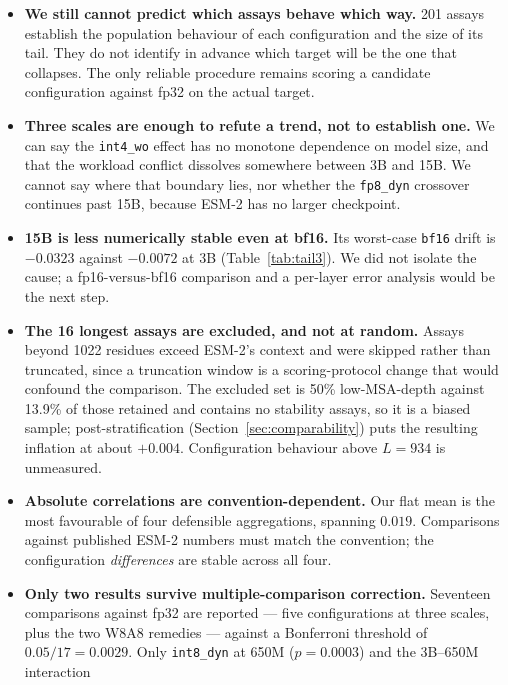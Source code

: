 \documentclass[11pt]{article}
\newcommand{\cfg}[1]{\texttt{#1}}
\begin{document}
\begin{itemize}
  \item \textbf{We still cannot predict which assays behave which way.} 201
        assays establish the population behaviour of each configuration and the
        size of its tail. They do not identify in advance which target will be
        the one that collapses. The only reliable procedure remains scoring a
        candidate configuration against fp32 on the actual target.
  \item \textbf{Three scales are enough to refute a trend, not to establish
        one.} We can say the \cfg{int4\_wo} effect has no monotone dependence on
        model size, and that the workload conflict dissolves somewhere between
        3B and 15B. We cannot say where that boundary lies, nor whether the
        \cfg{fp8\_dyn} crossover continues past 15B, because ESM-2 has no larger
        checkpoint.
  \item \textbf{15B is less numerically stable even at bf16.} Its worst-case
        \cfg{bf16} drift is $-0.0323$ against $-0.0072$ at 3B
        (Table~\ref{tab:tail3}). We did not isolate the cause; a fp16-versus-bf16
        comparison and a per-layer error analysis would be the next step.
  \item \textbf{The 16 longest assays are excluded, and not at random.} Assays
        beyond 1022 residues exceed ESM-2's context and were skipped rather
        than truncated, since a truncation window is a scoring-protocol change
        that would confound the comparison. The excluded set is 50\%
        low-MSA-depth against 13.9\% of those retained and contains no
        stability assays, so it is a biased sample; post-stratification
        (Section~\ref{sec:comparability}) puts the resulting inflation at about
        $+0.004$. Configuration behaviour above $L = 934$ is unmeasured.
  \item \textbf{Absolute correlations are convention-dependent.} Our flat mean
        is the most favourable of four defensible aggregations, spanning
        $0.019$. Comparisons against published ESM-2 numbers must match the
        convention; the configuration \emph{differences} are stable across all
        four.
  \item \textbf{Only two results survive multiple-comparison correction.}
        Seventeen comparisons against fp32 are reported --- five configurations
        at three scales, plus the two W8A8 remedies --- against a Bonferroni
        threshold of $0.05/17 = 0.0029$. Only
        \cfg{int8\_dyn} at 650M ($p = 0.0003$) and the 3B--650M interaction

\end{itemize}
\end{document}
